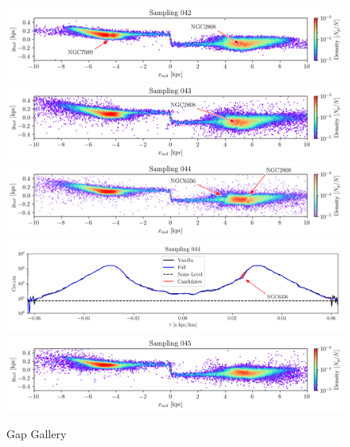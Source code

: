 \documentclass[draft]{aa}
\begin{document}
\begin{appendix}
    \begin{figure}
      \centering
      \includegraphics[width=\linewidth]{gallery_of_gaps_monte-carlo-042.png}
      \includegraphics[width=\linewidth]{gallery_of_gaps_monte-carlo-043.png}
      \includegraphics[width=\linewidth]{gallery_of_gaps_monte-carlo-044.png}
      \includegraphics[width=\linewidth]{tau-profile-monte-carlo-044.png}
      \includegraphics[width=\linewidth]{gallery_of_gaps_monte-carlo-045.png}
      \caption{Gap Gallery}
      \label{fig:gallery010}
    \end{figure}   


\end{appendix}
\end{document}
